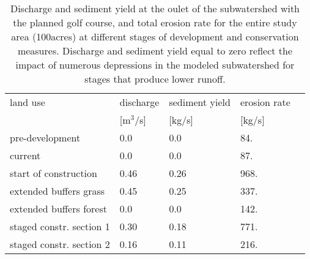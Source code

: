 \documentclass[fleqn,12pt,twoside]{article}
\begin{document}
\begin{table}[htb]
\caption{Discharge and sediment yield at the oulet of the subwatershed 
with the planned golf course, and total erosion rate for the entire study area (100acres)
at different stages of development and conservation measures.
Discharge and sediment yield equal to zero reflect the impact of numerous 
depressions in the modeled subwatershed for stages that produce lower runoff.}
\label{tab:cc}
\newcommand{\m}{\hphantom{$-$}}
\newcommand{\cc}[1]{\multicolumn{1}{c}{#1}}
\renewcommand{\tabcolsep}{1.8pc} %
\begin{tabular}{@{}lllll}
\hline
land use                  & discharge  & sediment yield & erosion rate \\
\quad                     & [m$^3$/s]  & [kg/s]         &  [kg/s]      \\
\hline
pre-development           & \m0.0  & \m0.0   & \m84. \\
current                   & \m0.0  & \m0.0   & \m87. \\
start of construction     & \m0.46 & \m0.26  & \m968. \\
extended buffers grass    & \m0.45 & \m0.25  & \m337.  \\
extended buffers forest   & \m0.0  & \m0.0   & \m142.  \\
staged constr. section 1  & \m0.30 & \m0.18  & \m771.  \\
staged constr. section 2  & \m0.16 & \m0.11  & \m216.  \\
\hline
\end{tabular}\\[2pt]
\end{table}



\end{document}
